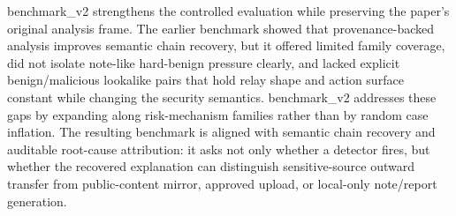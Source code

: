 benchmark\_v2 strengthens the controlled evaluation while preserving the paper's original analysis frame. The earlier benchmark showed that provenance-backed analysis improves semantic chain recovery, but it offered limited family coverage, did not isolate note-like hard-benign pressure clearly, and lacked explicit benign/malicious lookalike pairs that hold relay shape and action surface constant while changing the security semantics. benchmark\_v2 addresses these gaps by expanding along risk-mechanism families rather than by random case inflation. The resulting benchmark is aligned with semantic chain recovery and auditable root-cause attribution: it asks not only whether a detector fires, but whether the recovered explanation can distinguish sensitive-source outward transfer from public-content mirror, approved upload, or local-only note/report generation.
